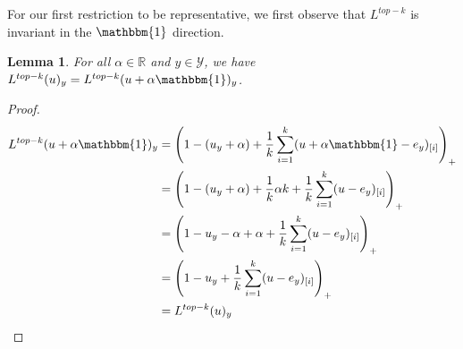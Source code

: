 \documentclass[12pt]{article}
\newcommand{\reals}{\mathbb{R}}
\newcommand{\Y}{\mathcal{Y}}
\newcommand{\ones}{\mathbbm{1}}
\newtheorem{lemma}{Lemma}
\begin{document}
For our first restriction to be representative, we first observe that $L^{top-k}$ is invariant in the $\ones$ direction.
\begin{lemma}\label{lem:invar-ones}
	For all $\alpha \in \reals$ and $y\in\Y$, we have $L^{top-k}(u)_y = L^{top-k}(u + \alpha \ones)_y$.
\end{lemma}
\begin{proof}
	\begin{align*}
	L^{top-k}(u + \alpha \ones)_y &= \left(1 - (u_y + \alpha) + \frac{1}{k} \sum_{i=1}^k (u + \alpha \ones  - e_y)_{[i]} \right)_+\\
	&= \left(1 - (u_y + \alpha) +\frac{1}{k} \alpha k + \frac{1}{k} \sum_{i=1}^k (u - e_y)_{[i]} \right)_+\\
	&= \left(1 -u_y - \alpha + \alpha + \frac{1}{k} \sum_{i=1}^k (u - e_y)_{[i]} \right)_+\\
	&= \left(1 -u_y + \frac{1}{k} \sum_{i=1}^k (u - e_y)_{[i]} \right)_+\\
	&= L^{top-k}(u)_y
	\end{align*}
\end{proof}
\end{document}

